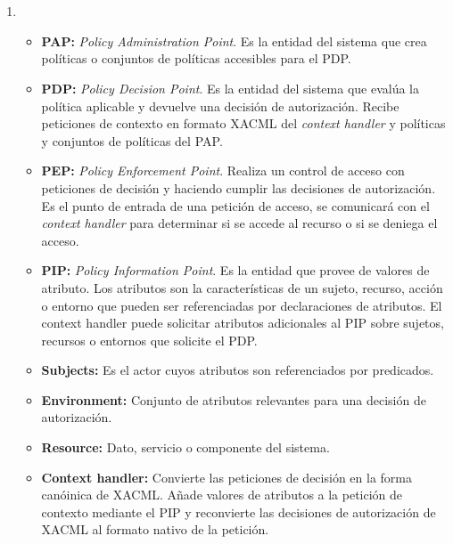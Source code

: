 \documentclass[10pt,a4paper]{article}
\begin{document}
\section{}
\begin{enumerate}[label=\alph*]
\item 

\begin{itemize}
\item \textbf{PAP:} \textit{Policy Administration Point}. Es la entidad del sistema que crea políticas o conjuntos de políticas accesibles para el PDP.
\item \textbf{PDP:} \textit{Policy Decision Point}. Es la entidad del sistema que evalúa la política aplicable y devuelve una decisión de autorización. Recibe peticiones de contexto en formato XACML del \textit{context handler} y políticas y conjuntos de políticas del PAP.
\item \textbf{PEP:} \textit{Policy Enforcement Point}. Realiza un control de acceso con peticiones de decisión y haciendo cumplir las decisiones de autorización. Es el punto de entrada de una petición de acceso, se comunicará con el \textit{context handler} para determinar si se accede al recurso o si se deniega el acceso.
\item \textbf{PIP:} \textit{Policy Information Point}. Es la entidad que provee de valores de atributo. Los atributos son la características de un sujeto, recurso, acción o entorno que pueden ser referenciadas por declaraciones de atributos. El context handler puede solicitar atributos adicionales al PIP sobre sujetos, recursos o entornos que solicite el PDP.
\item \textbf{Subjects:} Es el actor cuyos atributos son referenciados por predicados.
\item \textbf{Environment:} Conjunto de atributos relevantes para una decisión de autorización.
\item \textbf{Resource:} Dato, servicio o componente del sistema.
\item \textbf{Context handler:} Convierte las peticiones de decisión en la forma canóinica de XACML. Añade valores de atributos a la petición de contexto mediante el PIP y reconvierte las decisiones de autorización de XACML al formato nativo de la petición.
\end{itemize}


\end{enumerate}
\end{document}
